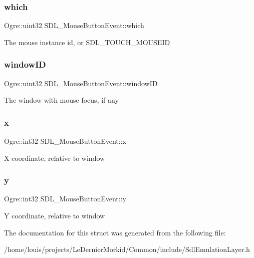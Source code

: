 \subsubsection{\texorpdfstring{which}{which}}
{\footnotesize\ttfamily Ogre\+::uint32 S\+D\+L\+\_\+\+Mouse\+Button\+Event\+::which}

The mouse instance id, or S\+D\+L\+\_\+\+T\+O\+U\+C\+H\+\_\+\+M\+O\+U\+S\+E\+ID \mbox{\label{struct_s_d_l___mouse_button_event_a41a4397c3620630c895d6be7a17090bd}} 
\subsubsection{\texorpdfstring{window\+ID}{windowID}}
{\footnotesize\ttfamily Ogre\+::uint32 S\+D\+L\+\_\+\+Mouse\+Button\+Event\+::window\+ID}

The window with mouse focus, if any \mbox{\label{struct_s_d_l___mouse_button_event_aeb46064b59c44d7432356d9323e6c877}} 
\subsubsection{\texorpdfstring{x}{x}}
{\footnotesize\ttfamily Ogre\+::int32 S\+D\+L\+\_\+\+Mouse\+Button\+Event\+::x}

X coordinate, relative to window \mbox{\label{struct_s_d_l___mouse_button_event_a811a7cc2e78a8740efed1bc6bb316819}} 
\subsubsection{\texorpdfstring{y}{y}}
{\footnotesize\ttfamily Ogre\+::int32 S\+D\+L\+\_\+\+Mouse\+Button\+Event\+::y}

Y coordinate, relative to window 

The documentation for this struct was generated from the following file\+:\begin{DoxyCompactItemize}
\item 
/home/louis/projects/\+Le\+Dernier\+Morkid/\+Common/include/Sdl\+Emulation\+Layer.\+h\end{DoxyCompactItemize}
